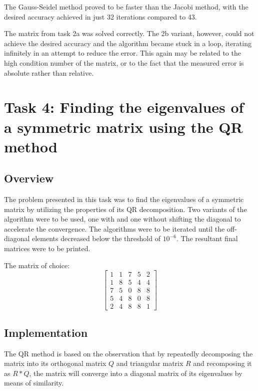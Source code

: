 \documentclass{article}
\begin{document}
	The Gauss-Seidel method proved to be faster than the Jacobi method, with the
	desired accuracy achieved in just 32 iterations compared to 43.

	The matrix from task 2a was solved correctly. The 2b variant, however, could
	not achieve the desired accuracy and the algorithm became stuck in a
	loop, iterating infinitely in an attempt to reduce the error. This again
	may be related to the high condition number of the matrix, or to the fact
	that the measured error is absolute rather than relative.

	\section{Task 4: Finding the eigenvalues of a symmetric matrix using the QR
	method}

	\subsection{Overview}

	The problem presented in this task was to find the eigenvalues of a
	symmetric matrix by utilizing the properties of its QR decomposition. Two
	variants of the algorithm were to be used, one with and one without shifting
	the diagonal to accelerate the convergence. The algorithms were to be
	iterated until the off-diagonal elements decreased below the threshold of
	$10^{-6}$. The resultant final matrices were to be printed.

	The matrix of choice:
	\begin{equation*}
		\begin{bmatrix}
			1 & 1 & 7 & 5 & 2\\
			1 & 8 & 5 & 4 & 4\\
			7 & 5 & 0 & 8 & 8\\
			5 & 4 & 8 & 0 & 8\\
			2 & 4 & 8 & 8 & 1
		\end{bmatrix}
	\end{equation*}

	\subsection{Implementation}

	The QR method is based on the observation that by repeatedly decomposing the
	matrix into its orthogonal matrix $Q$ and triangular matrix $R$ and
	recomposing it as $R * Q$, the matrix will converge into a diagonal matrix
	of its eigenvalues by means of similarity.
\end{document}
